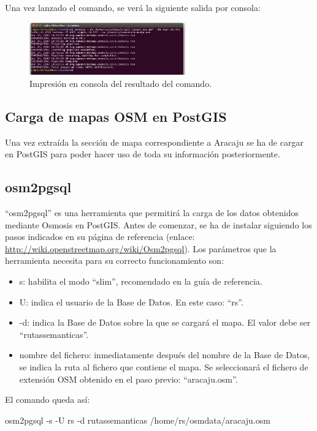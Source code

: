 Una vez lanzado el comando, se verá la siguiente salida por consola:

\begin{figure}[h]
  \centering
    \includegraphics[width=0.6\textwidth]{../img/osmextract/resultado.jpg}
  \caption{Impresión en consola del resultado del comando.}
  \label{puntosGeograficos}
\end{figure}

\subsection{Carga de mapas OSM en PostGIS}
Una vez extraída la sección de mapa correspondiente a Aracaju se ha de cargar en PostGIS para poder hacer uso de toda su información posteriormente.

\subsection{osm2pgsql}
``osm2pgsql'' es una herramienta que permitirá la carga de los datos obtenidos mediante Osmosis en PostGIS. Antes de comenzar, se ha de instalar siguiendo los pasos indicados en su página de referencia (enlace: \url{http://wiki.openstreetmap.org/wiki/Osm2pgsql}). Los parámetros que la herramienta necesita para su correcto funcionamiento son:

\begin{itemize}
	\item s: habilita el modo ``slim'', recomendado en la guía de referencia.
	\item U: indica el usuario de la Base de Datos. En este caso: ``rs''.
	\item -d: indica la Base de Datos sobre la que se cargará el mapa. El valor debe ser ``rutassemanticas''.
	\item nombre del fichero: inmediatamente después del nombre de la Base de Datos, se indica la ruta al fichero que contiene el mapa. Se seleccionará el fichero de extensión OSM obtenido en el paso previo: ``aracaju.osm''.
\end{itemize}

El comando queda así:

osm2pgsql -s -U rs -d rutassemanticas /home/rs/osmdata/aracaju.osm

